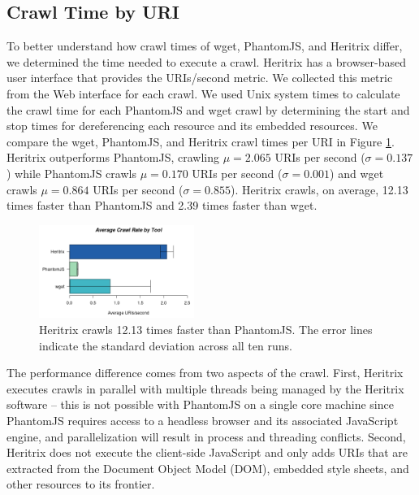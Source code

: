 \documentclass{ipres_proc_article-sp}
\begin{document}

\subsection{Crawl Time by URI}
\label{clock}
To better understand how crawl times of wget, PhantomJS, and Heritrix differ, we determined the time needed to execute a crawl. Heritrix has a browser-based user interface that provides the URIs/second metric. We collected this metric from the Web interface for each crawl. We used Unix system times to calculate the crawl time for each PhantomJS and wget crawl by determining the start and stop times for dereferencing each resource and its embedded resources. We compare the wget, PhantomJS, and Heritrix crawl times per URI in Figure \ref{crawlrate}. Heritrix outperforms PhantomJS, crawling $\mu=2.065$ URIs per second ($\sigma = 0.137$) while PhantomJS crawls $\mu=0.170$ URIs per second ($\sigma = 0.001$) and wget crawls $\mu=0.864$ URIs per second ($\sigma = 0.855$). Heritrix crawls, on average, 12.13 times faster than PhantomJS and 2.39 times faster than wget.

\begin{figure}
  \begin{center}
    	\includegraphics[width=0.45\textwidth,keepaspectratio]{./imgs/rateBarStats.png}
  \end{center}
  \caption{Heritrix crawls 12.13 times faster than PhantomJS. The error lines indicate the standard deviation across all ten runs.}
  \label{crawlrate}
\end{figure}

The performance difference comes from two aspects of the crawl. First, Heritrix executes crawls in parallel with multiple threads being managed by the Heritrix software -- this is not possible with PhantomJS on a single core machine since PhantomJS requires access to a headless browser and its associated JavaScript engine, and parallelization will result in process and threading conflicts. Second, Heritrix does not execute the client-side JavaScript and only adds URIs that are extracted from the Document Object Model (DOM), embedded style sheets, and other resources to its frontier. 
\end{document}
